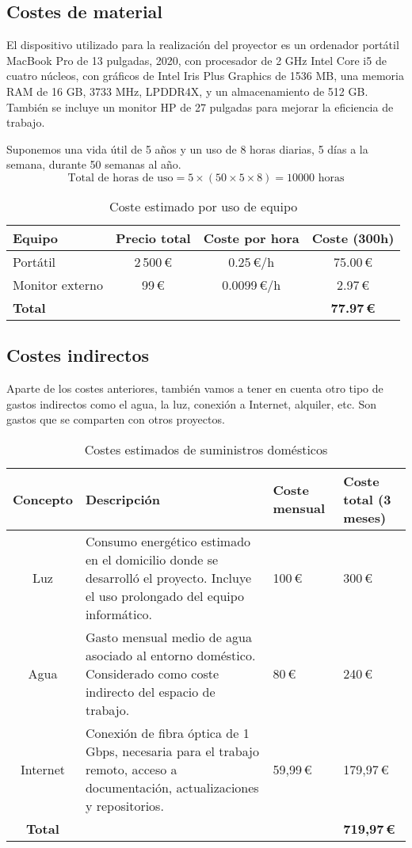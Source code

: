 \subsection{Costes de material}
El dispositivo utilizado para la realización del proyector es un ordenador portátil MacBook Pro de 13 pulgadas, 2020, con procesador de 2 GHz Intel Core i5 de cuatro núcleos, con gráficos de Intel Iris Plus Graphics de 1536 MB, una memoria RAM de 16 GB, 3733 MHz, LPDDR4X, y un almacenamiento de 512 GB. También se incluye un monitor HP de 27 pulgadas para mejorar la eficiencia de trabajo.

Suponemos una vida útil de 5 años y un uso de 8 horas diarias, 5 días a la semana, durante 50 semanas al año.
\[
\text{Total de horas de uso} = 5 \times (50 \times 5 \times 8) = 10 000 \text{ horas}
\]
\begin{table}[H]
\centering
\begin{tabular}{|l|c|c|c|}
\hline
\textbf{Equipo} & \textbf{Precio total} & \textbf{Coste por hora} & \textbf{Coste (300h)} \\
\hline
Portátil & 2\,500\,\euro{} & 0.25\,\euro{}/h & 75.00\,\euro{} \\ 
\hline
Monitor externo & 99\,\euro{} & 0.0099\,\euro{}/h & 2.97\,\euro{} \\
\hline
\textbf{Total} & & & \textbf{77.97\,\euro{}} \\
\hline
\end{tabular}
\caption{Coste estimado por uso de equipo}
\label{tab:coste_equipo}
\end{table}

\subsection{Costes indirectos}
Aparte de los costes anteriores, también vamos a tener en cuenta otro tipo de gastos indirectos como el agua, la luz, conexión a Internet, alquiler, etc. Son gastos que se comparten con otros proyectos.

\begin{table}[H]
\centering
\begin{tabular}{|c|p{7cm}|p{2cm}|p{2cm}|}
\hline
\textbf{Concepto} & \textbf{Descripción} & \textbf{Coste mensual} & \textbf{Coste total (3 meses)} \\
\hline
Luz & Consumo energético estimado en el domicilio donde se desarrolló el proyecto. Incluye el uso prolongado del equipo informático. & 100\,\euro{} & 300\,\euro{} \\
\hline
Agua & Gasto mensual medio de agua asociado al entorno doméstico. Considerado como coste indirecto del espacio de trabajo. & 80\,\euro{} & 240\,\euro{} \\
\hline
Internet & Conexión de fibra óptica de 1\,Gbps, necesaria para el trabajo remoto, acceso a documentación, actualizaciones y repositorios. & 59,99\,\euro{} & 179,97\,\euro{} \\
\hline
\textbf{Total} & & & \textbf{719,97\,\euro{}} \\
\hline
\end{tabular}
\caption{Costes estimados de suministros domésticos}
\label{tab:costes_descripcion_suministros}
\end{table}


